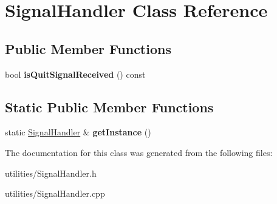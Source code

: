 \hypertarget{classSignalHandler}{\section{Signal\-Handler Class Reference}
\label{classSignalHandler}
}
\subsection*{Public Member Functions}
\begin{DoxyCompactItemize}
\item 
\hypertarget{classSignalHandler_aee07a6ca1a8d656b6335a7be159e2858}{bool {\bfseries is\-Quit\-Signal\-Received} () const }\label{classSignalHandler_aee07a6ca1a8d656b6335a7be159e2858}

\end{DoxyCompactItemize}
\subsection*{Static Public Member Functions}
\begin{DoxyCompactItemize}
\item 
\hypertarget{classSignalHandler_a15631110fc9c8fee4c1b2bf3bced2de3}{static \hyperlink{classSignalHandler}{Signal\-Handler} \& {\bfseries get\-Instance} ()}\label{classSignalHandler_a15631110fc9c8fee4c1b2bf3bced2de3}

\end{DoxyCompactItemize}


The documentation for this class was generated from the following files\-:\begin{DoxyCompactItemize}
\item 
utilities/Signal\-Handler.\-h\item 
utilities/Signal\-Handler.\-cpp\end{DoxyCompactItemize}
